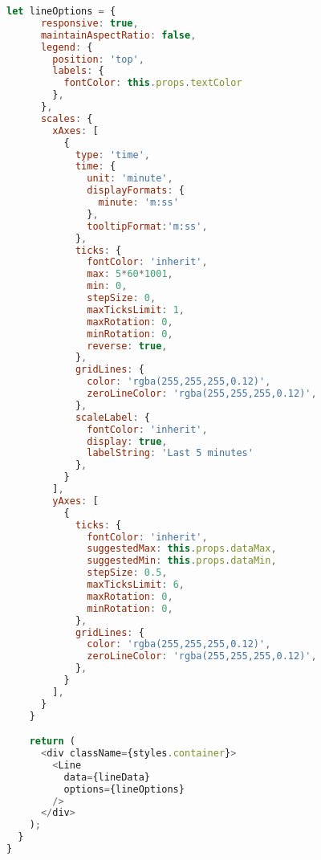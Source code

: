 \documentclass[a4paper,12pt,twoside,openright,titlepage]{book}
\begin{document}
\begin{lstlisting}[title={raspberrypi/ui/components/LineGraph.js}, language=JavaScript]
    let lineOptions = {
      responsive: true,
      maintainAspectRatio: false,
      legend: {
        position: 'top',
        labels: {
          fontColor: this.props.textColor
        },
      },
      scales: {
        xAxes: [
          {
            type: 'time',
            time: {
              unit: 'minute',
              displayFormats: {
                minute: 'm:ss'
              },
              tooltipFormat:'m:ss',
            },
            ticks: {
              fontColor: 'inherit',
              max: 5*60*1001,
              min: 0,
              stepSize: 0,
              maxTicksLimit: 1,
              maxRotation: 0,
              minRotation: 0,
              reverse: true,
            },
            gridLines: {
              color: 'rgba(255,255,255,0.12)',
              zeroLineColor: 'rgba(255,255,255,0.12)',
            },
            scaleLabel: {
              fontColor: 'inherit',
              display: true,
              labelString: 'Last 5 minutes'
            },
          }
        ],
        yAxes: [
          {
            ticks: {
              fontColor: 'inherit',
              suggestedMax: this.props.dataMax,
              suggestedMin: this.props.dataMin,
              stepSize: 0.5,
              maxTicksLimit: 6,
              maxRotation: 0,
              minRotation: 0,
            },
            gridLines: {
              color: 'rgba(255,255,255,0.12)',
              zeroLineColor: 'rgba(255,255,255,0.12)',
            },
          }
        ],
      }
    }

    return (
      <div className={styles.container}>
        <Line
          data={lineData}
          options={lineOptions}
        />
      </div>
    );
  }
}
\end{lstlisting}

\bigskip
\end{document}
